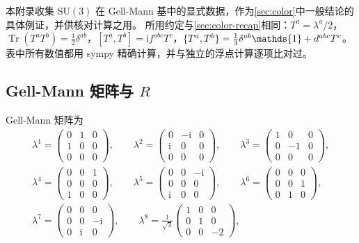 \documentclass[UTF8,a4paper,11pt,fontset=fandol]{ctexart}
\let\amsmathbb\mathbb
\renewcommand{\mathbb}[1]{\ifx1#1\mathds{1}\else\amsmathbb{#1}\fi}
\theoremstyle{cplain}
\theoremstyle{cdefinition}
\theoremstyle{cremark}
\numberwithin{equation}{section}
\DeclareMathOperator{\Tr}{Tr}
\newcommand{\ii}{\mathrm{i}}                        %
\begin{document}
本附录收集 $\mathrm{SU}(3)$ 在 Gell-Mann 基中的显式数据，作为\cref{sec:color}中一般结论的具体例证，并供核对计算之用。
所用约定与\cref{sec:color-recap}相同：$T^a=\lambda^a/2$，$\Tr(T^aT^b)=\frac12\delta^{ab}$，$[T^a,T^b]=\ii f^{abc}T^c$，$\{T^a,T^b\}=\frac13\delta^{ab}\mathbb 1+d^{abc}T^c$。
表中所有数值都用 sympy 精确计算，并与独立的浮点计算逐项比对过。

\subsection{Gell-Mann 矩阵与 \texorpdfstring{$R$}{R}}\label{sec:app-su3-R}

Gell-Mann 矩阵\cite{GellMann1962}为
\begin{equation}\label{eq:app-su3-gellmann}
\begin{gathered}
\lambda^{1}=\begin{pmatrix}0&1&0\\1&0&0\\0&0&0\end{pmatrix},\qquad
\lambda^{2}=\begin{pmatrix}0&-\ii&0\\\ii&0&0\\0&0&0\end{pmatrix},\qquad
\lambda^{3}=\begin{pmatrix}1&0&0\\0&-1&0\\0&0&0\end{pmatrix},\\
\lambda^{4}=\begin{pmatrix}0&0&1\\0&0&0\\1&0&0\end{pmatrix},\qquad
\lambda^{5}=\begin{pmatrix}0&0&-\ii\\0&0&0\\\ii&0&0\end{pmatrix},\qquad
\lambda^{6}=\begin{pmatrix}0&0&0\\0&0&1\\0&1&0\end{pmatrix},\\
\lambda^{7}=\begin{pmatrix}0&0&0\\0&0&-\ii\\0&\ii&0\end{pmatrix},\qquad
\lambda^{8}=\frac{1}{\sqrt{3}}\begin{pmatrix}1&0&0\\0&1&0\\0&0&-2\end{pmatrix},
\end{gathered}
\end{equation}
\end{document}
